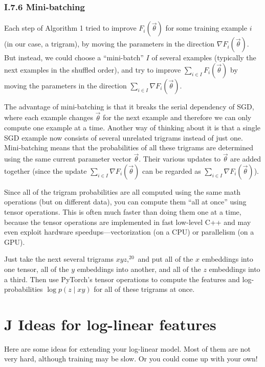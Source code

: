 \subsubsection*{I.7.6 Mini-batching}

Each step of Algorithm 1 tried to improve $F_i(\vec{\theta})$ for some training example $i$ (in our case, a trigram), by moving the parameters in the direction $\nabla F_i(\vec{\theta})$. But instead, we could choose a “mini-batch” $I$ of several examples (typically the next examples in the shuffled order), and try to improve $\sum_{i \in I} F_i(\vec{\theta})$ by moving the parameters in the direction $\sum_{i \in I} \nabla F_i(\vec{\theta})$.

The advantage of mini-batching is that it breaks the serial dependency of SGD, where each example changes $\vec{\theta}$ for the next example and therefore we can only compute one example at a time. Another way of thinking about it is that a single SGD example now consists of several unrelated trigrams instead of just one. Mini-batching means that the probabilities of all these trigrams are determined using the same current parameter vector $\vec{\theta}$. Their various updates to $\vec{\theta}$ are added together (since the update $\sum_{i \in I} \nabla F_i(\vec{\theta})$ can be regarded as $\sum_{i \in I} \nabla F_i(\vec{\theta})$).

Since all of the trigram probabilities are all computed using the same math operations (but on different data), you can compute them “all at once” using tensor operations. This is often much faster than doing them one at a time, because the tensor operations are implemented in fast low-level C++ and may even exploit hardware speedups—vectorization (on a CPU) or parallelism (on a GPU).

Just take the next several trigrams $xyz,^{20}$ and put all of the $x$ embeddings into one tensor, all of the $y$ embeddings into another, and all of the $z$ embeddings into a third. Then use PyTorch’s tensor operations to compute the features and log-probabilities $\log p(z \mid xy)$ for all of these trigrams at once.

\section*{J Ideas for log-linear features}

Here are some ideas for extending your log-linear model. Most of them are not very hard, although training may be slow. Or you could come up with your own!

